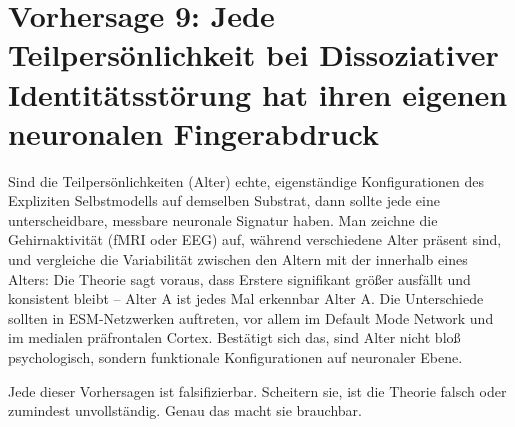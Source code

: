 \documentclass[11pt, twoside, openright]{book}
\begin{document}
\section*{Vorhersage 9: Jede Teilpersönlichkeit bei Dissoziativer Identitätsstörung hat ihren eigenen neuronalen Fingerabdruck}

Sind die Teilpersönlichkeiten (Alter) echte, eigenständige Konfigurationen des Expliziten Selbstmodells auf demselben Substrat, dann sollte jede eine unterscheidbare, messbare neuronale Signatur haben. Man zeichne die Gehirnaktivität (fMRI oder EEG) auf, während verschiedene Alter präsent sind, und vergleiche die Variabilität zwischen den Altern mit der innerhalb eines Alters: Die Theorie sagt voraus, dass Erstere signifikant größer ausfällt und konsistent bleibt -- Alter A ist jedes Mal erkennbar Alter A. Die Unterschiede sollten in ESM-Netzwerken auftreten, vor allem im Default Mode Network und im medialen präfrontalen Cortex. Bestätigt sich das, sind Alter nicht bloß psychologisch, sondern funktionale Konfigurationen auf neuronaler Ebene.

Jede dieser Vorhersagen ist falsifizierbar. Scheitern sie, ist die Theorie falsch oder zumindest unvollständig. Genau das macht sie brauchbar.
\end{document}
